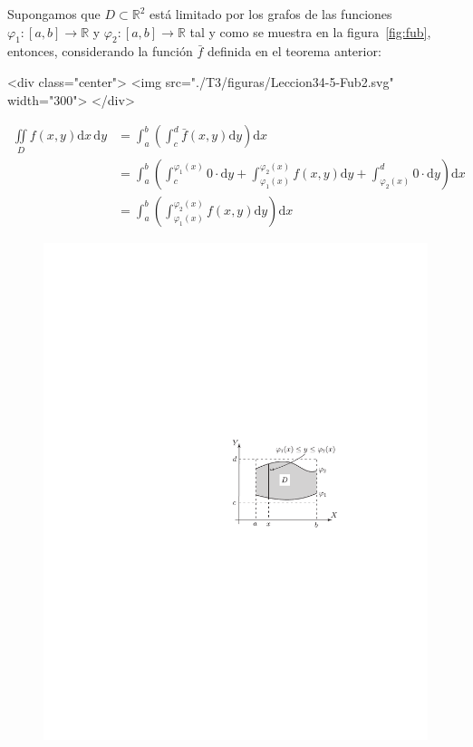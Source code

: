 \begin{ejemplo}
Supongamos que $\mathit D\subset\mathbb{R}^2$ está limitado por los grafos de las funciones
$\varphi_1\colon [a,b]\to\mathbb{R}$ y $\varphi_2\colon [a,b]\to\mathbb{R}$ tal y como se muestra en la
figura~\ref{fig:fub}, entonces, considerando la función $\bar{f}$ definida en el
teorema anterior:
\begin{rawhtml}
<div class="center">
<img src="./T3/figuras/Leccion34-5-Fub2.svg" width="300">
</div>
\end{rawhtml}
\begin{align*}
\iint\limits_{\mathit D} f(x,y)\mathrm dx\,\mathrm dy & 
=\int_a^b\left(\int_c^{\mathit d}\bar{f}(x,y)\mathrm dy\right)\mathrm dx\\
& =\int_a^b\left(\int_c^{\varphi_1(x)}0\cdot \mathrm dy+
\int_{\varphi_1(x)}^{\varphi_2(x)}f(x,y) \mathrm dy+\int_{\varphi_2(x)}^{\mathit d}0\cdot \mathrm dy\right)\mathrm dx \\
& =\int_a^b\left(\int_{\varphi_1(x)}^{\varphi_2(x)}f(x,y)\mathrm dy\right)\mathrm dx
\end{align*}
%
\begin{latexonly}
\begin{figure}
\begin{center}
\includegraphics{T3/figs/Fub2.pdf}\\

\end{center}
\end{figure}
\end{latexonly}
\end{ejemplo}
